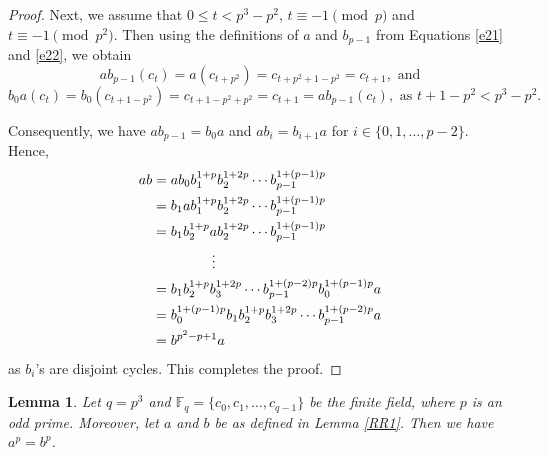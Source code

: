 \documentclass[11pt]{amsart}
\theoremstyle{plain}
\newtheorem{lem}[thm]{Lemma}
\numberwithin{equation}{section}
\def\F{{\mathbb F}}
\begin{document}
\begin{proof}
Next, we assume that $0 \leq t < p^{3}-p^2$, $t \equiv -1 \pmod p$ and $t \equiv -1 \pmod {p^2}$. Then using the definitions of $a$ and $b_{p-1}$ from Equations \eqref{e21} and \eqref{e22}, we obtain
\[
ab_{p-1}(c_t)=a(c_{t+p^2})=c_{t+p^2+1-p^2}=c_{t+1}, \text{ and}
\]
\[
b_0a(c_t)=b_0(c_{t+1-p^2})=c_{t+1-p^2+p^2}=c_{t+1}=ab_{p-1}(c_t), \text{ as } t+1-p^2 < p^{3}-p^2.
\]


Consequently, we have  $ab_{p-1}=b_0a$ and $ab_i=b_{i+1}a$ for $i \in \{0,1,\ldots,p-2\}$. Hence, 
\begin{equation*}
\begin{split}
ab&=ab_{0}b_{1}^{1+p}b_2^{1+2p}\cdots b_{p-1}^{1+(p-1)p}
\\& =b_1ab_{1}^{1+p}b_2^{1+2p}\cdots b_{p-1}^{1+(p-1)p}
\\&= b_1b_{2}^{1+p}ab_2^{1+2p}\cdots b_{p-1}^{1+(p-1)p}
\\&
\hspace{1.5cm}\vdots
\\&=b_1b_{2}^{1+p}b_3^{1+2p}\cdots b_{p-1}^{1+(p-2)p}b_{0}^{1+(p-1)p}a
\\&=b_{0}^{1+(p-1)p}b_1b_{2}^{1+p}b_3^{1+2p}\cdots b_{p-1}^{1+(p-2)p}a
\\&=b^{p^2-p+1}a
\end{split}
\end{equation*}
as $b_{i}$'s are disjoint cycles. This completes the proof.
 \end{proof}
 \begin{lem}\label{RR2}
 Let $q=p^3$ and $\F_q=\{c_0,c_1,\ldots,c_{q-1}\}$ be the finite field, where $p$ is an odd prime. Moreover, let $a$ and $b$ be as defined in Lemma \ref{RR1}. Then we have $a^p=b^p$. 
 \end{lem}
\end{document}
